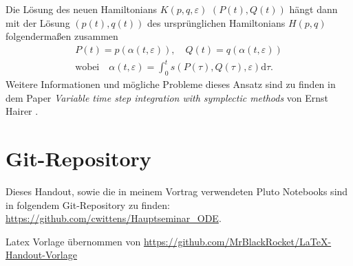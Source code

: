 \documentclass{handout}
\begin{document}
Die Lösung des neuen Hamiltonians $K(p, q, \varepsilon)$  $(P(t),Q(t))$ hängt dann mit der Lösung $(p(t),q(t))$ des ursprünglichen Hamiltonians $H(p, q)$ folgendermaßen zusammen
\begin{equation}
\begin{split}
    P(t)=p(\alpha(t, \varepsilon)), \quad Q(t)=q(\alpha(t, \varepsilon)) \\
    \text{wobei} \quad \alpha(t, \varepsilon)=\int_0^t s(P(\tau), Q(\tau), \varepsilon) \mathrm{d} \tau .
\end{split}
\end{equation}
Weitere Informationen und mögliche Probleme dieses Ansatz sind zu finden in dem Paper \textit{Variable time step integration with symplectic methods} von Ernst Hairer \cite{HAIRER1997219}.

\section*{Git-Repository}
Dieses Handout, sowie die in meinem Vortrag verwendeten Pluto Notebooks sind in folgendem Git-Repository zu finden: \href{https://github.com/cwittens/Hauptseminar_ODE}{https://github.com/cwittens/Hauptseminar\_ODE}.


\makeliteratur
Latex Vorlage übernommen von \href{https://github.com/MrBlackRocket/LaTeX-Handout-Vorlage}{https://github.com/MrBlackRocket/LaTeX-Handout-Vorlage}
\end{document}
